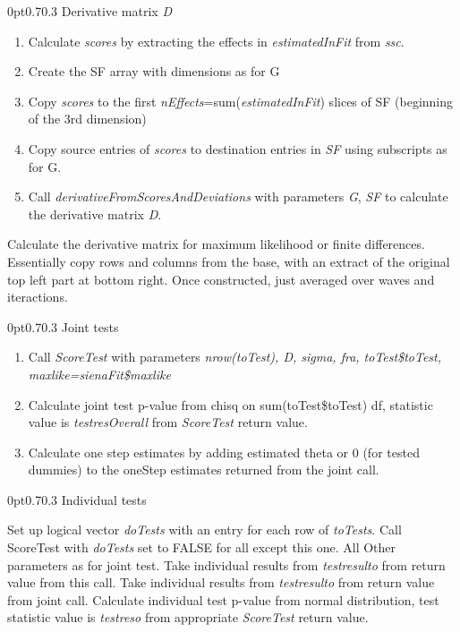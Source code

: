 \documentclass[12pt,a4paper]{article}
\makeatletter
\renewcommand{\=}{\,=\,}
\newcommand{\+}{\,+\,}
\newcommand{\nnm}[1]{\textsf{\small\textit{#1}}}
\renewcommand{\subsection}{\@startsection{subsection}{2}
                {0pt}{0.7\baselineskip}{0.3\baselineskip}
                {\sffamily} }
\makeatother
\begin{document}
\subsection{Derivative matrix \nnm{D}}
\label{sec:deriv}
\begin{algorithmic}
\item \begin{enumerate}
\item Calculate \nnm{scores} by extracting the effects in
\nnm{estimatedInFit} from \nnm{ssc}.
\item Create the SF array with dimensions as for G
\item Copy  \nnm{scores} to the first
\nnm{nEffects}=sum(\nnm{estimatedInFit})
slices of  SF (beginning of the 3rd dimension)
\item Copy source entries of \nnm{scores} to destination entries in \nnm{SF}
using subscripts as for G.
\item Call \nnm{derivativeFromScoresAndDeviations} with parameters \nnm{G},
\nnm{SF} to calculate the derivative matrix \nnm{D}.
\end{enumerate}
\ELSE
\item Calculate the derivative matrix for maximum likelihood or
finite differences. Essentially copy rows and columns from the base, with an
extract of the original top left part at bottom right.
Once constructed, just averaged over waves and iteractions.
\ENDIF
\end{algorithmic}
\subsection{Joint tests}
\label{sec:joint}
\begin{enumerate}
\item Call \nnm{ScoreTest} with parameters \nnm{nrow(toTest), D,
sigma, fra, toTest\$toTest, maxlike=sienaFit\$maxlike}
\item Calculate joint test p-value from chisq on sum(toTest\$toTest) df,
statistic value is \nnm{testresOverall} from \nnm{ScoreTest} return value.
\item Calculate one step estimates by adding estimated theta or 0 (for tested
dummies) to the oneStep estimates returned from the joint call.
\end{enumerate}
\subsection{Individual tests}
\label{sec:indiv}
\begin{algorithmic}
\STATE Set up logical vector \nnm{doTests} with an entry for each row of
\nnm{toTests}.
\STATE Call ScoreTest with \nnm{doTests} set to FALSE for all except this one.
All Other parameters as for joint test.
\STATE Take individual results from \nnm{testresulto} from return value from
this call.
\ENDFOR
\ELSE
\STATE Take individual results from \nnm{testresulto} from return value from
joint call.
\ENDIF
\STATE Calculate individual test p-value from normal distribution, test
statistic value is \nnm{testreso} from appropriate \nnm{ScoreTest} return
value.
\end{algorithmic}
\end{document}
